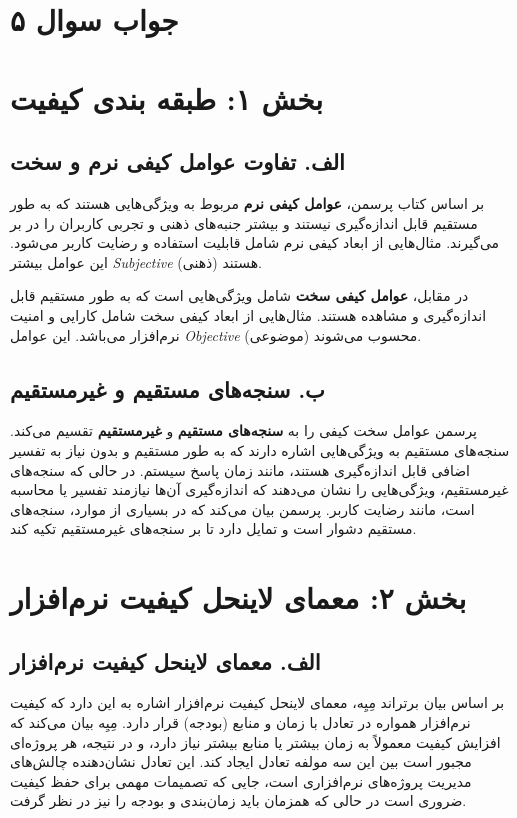 \section*{جواب سوال ۵}

\section*{بخش ۱: طبقه بندی کیفیت}

\subsection*{الف. تفاوت عوامل کیفی نرم و سخت}

بر اساس کتاب پرسمن، \textbf{عوامل کیفی نرم} مربوط به ویژگی‌هایی هستند که به طور مستقیم قابل اندازه‌گیری نیستند و بیشتر جنبه‌های ذهنی و تجربی کاربران را در بر می‌گیرند. مثال‌هایی از ابعاد کیفی نرم شامل قابلیت استفاده و رضایت کاربر می‌شود. این عوامل بیشتر \textit{Subjective} (ذهنی) هستند.

در مقابل، \textbf{عوامل کیفی سخت} شامل ویژگی‌هایی است که به طور مستقیم قابل اندازه‌گیری و مشاهده هستند. مثال‌هایی از ابعاد کیفی سخت شامل کارایی و امنیت نرم‌افزار می‌باشد. این عوامل \textit{Objective} (موضوعی) محسوب می‌شوند.

\subsection*{ب. سنجه‌های مستقیم و غیرمستقیم}

پرسمن عوامل سخت کیفی را به \textbf{سنجه‌های مستقیم} و \textbf{غیرمستقیم} تقسیم می‌کند. سنجه‌های مستقیم به ویژگی‌هایی اشاره دارند که به طور مستقیم و بدون نیاز به تفسیر اضافی قابل اندازه‌گیری هستند، مانند زمان پاسخ سیستم. در حالی که سنجه‌های غیرمستقیم، ویژگی‌هایی را نشان می‌دهند که اندازه‌گیری آن‌ها نیازمند تفسیر یا محاسبه است، مانند رضایت کاربر. پرسمن بیان می‌کند که در بسیاری از موارد، سنجه‌های مستقیم دشوار است و تمایل دارد تا بر سنجه‌های غیرمستقیم تکیه کند.

\section*{بخش ۲: معمای لاینحل کیفیت نرم‌افزار}


\subsection*{الف. معمای لاینحل کیفیت نرم‌افزار}

بر اساس بیان برتراند مِیِه، معمای لاینحل کیفیت نرم‌افزار اشاره به این دارد که کیفیت نرم‌افزار همواره در تعادل با زمان و منابع (بودجه) قرار دارد. مِیِه بیان می‌کند که افزایش کیفیت معمولاً به زمان بیشتر یا منابع بیشتر نیاز دارد، و در نتیجه، هر پروژه‌ای مجبور است بین این سه مولفه تعادل ایجاد کند. این تعادل نشان‌دهنده چالش‌های مدیریت پروژه‌های نرم‌افزاری است، جایی که تصمیمات مهمی برای حفظ کیفیت ضروری است در حالی که همزمان باید زمان‌بندی و بودجه را نیز در نظر گرفت.


